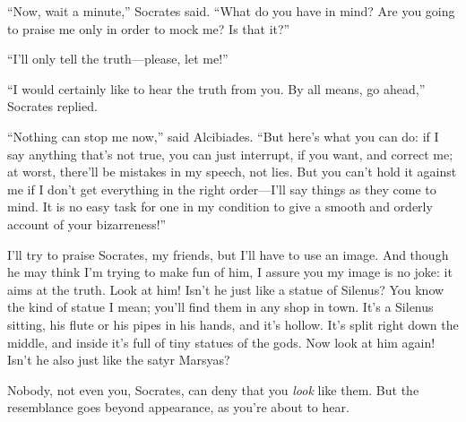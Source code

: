 “Now, wait a minute,” Socrates said. “What do you have in mind? Are you
going to praise me only in order to mock me? Is that it?”

“I’ll only tell the truth---please, let me!”

“I would certainly like to hear the truth from you. By all means, go
ahead,” Socrates replied.

“Nothing can stop me now,” said Alcibiades. “But here’s what you can do:
if I say anything that’s not true, you can just interrupt, if you want,
and correct me; at worst, there’ll be mistakes in my speech, not lies.
But  you can’t hold it against me if I don’t get
everything in the right order---I’ll say things as they come to mind. It
is no easy task for one in my condition to give a smooth and orderly
account of your bizarreness!”

\blank[line]

I’ll try to praise Socrates, my friends, but I’ll have to use an image.
And though he may think I’m trying to make fun of him, I assure you my
image is no joke: it aims at the truth. Look at him! Isn’t he just like
a statue  of Silenus? You know the kind of statue I mean; you’ll
find them in any shop in town. It’s a Silenus sitting, his
flute or his pipes in
his hands, and it’s hollow. It’s split right down the middle, and inside
it’s full of tiny statues of the gods. Now look at him again! Isn’t he
also just like the satyr
Marsyas?

Nobody, not even you, Socrates, can deny that you {\em look} like them.
But the resemblance goes beyond appearance, as you’re about to hear.

